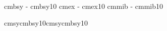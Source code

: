 \def\loadCMboldmath{%
  \loadmathfam 0[/cmbx8z]%
  \defaultskewchar=127
  \loadmathfam 1[/cmmib]%
  \defaultskewchar=48
  \loadmathfam 2[/cmbsy]%
  \defaultskewchar=-1
  \noindexsize\loadmathfam 3[/cmex]%
  \chardef\itfam   4
  \noindexsize\loadmathfam \itfam [/cmbxti\fotenc]%
  \chardef\slfam   5
  \noindexsize\loadmathfam \slfam [/cmbxsl\fotenc]%
  \chardef\bffam   6
  \loadmathfam \bffam [/cmbx\fotenc]%
  \chardef\ttfam   7
  \noindexsize\loadmathfam \ttfam [/cmtt\fotenc]%
  \lastfam =7
}
\def\setPSmathchars{\mathencread ofs-ps;}
\let\setCMmathchars=\relax  %


\registertfm   cmbsy  -  cmbsy10
\registertfm   cmex   -  cmex10
\registertfm   cmmib  -  cmmib10


\ifx \fomenc\undefined {}\fi 
\def\mathversion{normal}
\def\defaultmathfonts{%
   \expandafter \ifx \csname load\fomenc\mathversion math\endcsname \relax
      \message{\ofsmessageheader WARNING:
               \string\fomenc=\fomenc\space -- undeclared font-set, 
               I use \string\def\string\fomenc{PS}}
      \def\fomenc{PS}%
   \fi
   \csname load\fomenc\mathversion math\endcsname}
\def\defaultmathchars{\csname set\fomenc mathchars\endcsname}
\let\mathcharsback=\relax
\def\mathfonts{\defaultmathfonts}
\def\mathchars{\defaultmathchars}


 {cmsy}{cmbsy10}{cmsy}{cmbsy10}

\def\ofscopyright{{\ooalign{\hfil\raise.07ex\hbox{c}\hfil\crcr\ofshexbox20D}}}



\def\dots{.%
   \ifmmode         %
      \mathinner{\ldotp\ldotp}%
   \else
      \ifdim\fontdimen3\font=0pt %
         ..%
      \else
          \kern.5\fontdimen2\font
         .\kern.5\fontdimen2\font
         .\kern.5\fontdimen2\font
   \fi\fi
}

\endinput

